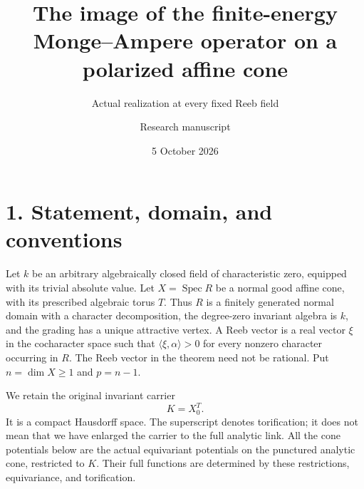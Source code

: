 \documentclass[
  10pt,
]{article}
\title{The image of the finite-energy Monge--Ampere operator on a
polarized affine cone}
\subtitle{Actual realization at every fixed Reeb field}
\author{Research manuscript}
\date{5 October 2026}
\begin{document}
\maketitle

\section{1. Statement, domain, and
conventions}\label{statement-domain-and-conventions}

Let \(k\) be an arbitrary algebraically closed field of characteristic
zero, equipped with its trivial absolute value. Let
\(X=\operatorname{Spec}R\) be a normal good affine cone, with its
prescribed algebraic torus \(T\). Thus \(R\) is a finitely generated
normal domain with a character decomposition, the degree-zero invariant
algebra is \(k\), and the grading has a unique attractive vertex. A Reeb
vector is a real vector \(\xi\) in the cocharacter space such that
\(\langle\xi,\alpha\rangle>0\) for every nonzero character occurring in
\(R\). The Reeb vector in the theorem need not be rational. Put
\(n=\dim X\geq1\) and \(p=n-1\).

We retain the original invariant carrier \[
                         K=X_0^T.
\] It is a compact Hausdorff space. The superscript denotes
torification; it does not mean that we have enlarged the carrier to the
full analytic link. All the cone potentials below are the actual
equivariant potentials on the punctured analytic cone, restricted to
\(K\). Their full functions are determined by these restrictions,
equivariance, and torification.
\end{document}
